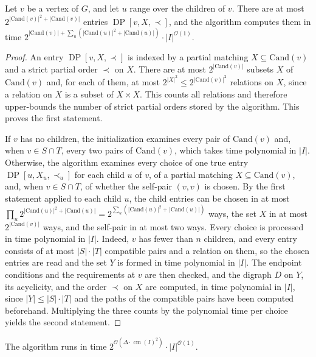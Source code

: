 \documentclass[a4paper,USenglish,thm-restate]{lipics-v2021}
\newcommand{\cm}{\operatorname{cm}}
\newcommand{\cand}{\mathrm{Cand}}
\theoremstyle{problemstyle}
\begin{document}
\begin{lemma}\label{lem:tree-dp-vertex-time}
Let $v$ be a vertex of $G$, and let $u$ range over the children of $v$. There are at most $2^{|\cand(v)|^2+|\cand(v)|}$ entries $\operatorname{DP}[v,X,\prec]$, and the algorithm computes them in time $2^{|\cand(v)|+\sum_u(|\cand(u)|^2+|\cand(u)|)}\cdot|I|^{\mathcal{O}(1)}$.
\end{lemma}

\begin{proof}
An entry $\operatorname{DP}[v,X,\prec]$ is indexed by a partial matching $X\subseteq\cand(v)$ and a strict partial order $\prec$ on $X$. There are at most $2^{|\cand(v)|}$ subsets $X$ of $\cand(v)$ and, for each of them, at most $2^{|X|^2}\le 2^{|\cand(v)|^2}$ relations on $X$, since a relation on $X$ is a subset of $X\times X$. This counts all relations and therefore upper-bounds the number of strict partial orders stored by the algorithm. This proves the first statement.

If $v$ has no children, the initialization examines every pair of $\cand(v)$ and, when $v\in S\cap T$, every two pairs of $\cand(v)$, which takes time polynomial in $|I|$. Otherwise, the algorithm examines every choice of one true entry $\operatorname{DP}[u,X_u,\prec_u]$ for each child $u$ of $v$, of a partial matching $X\subseteq\cand(v)$, and, when $v\in S\cap T$, of whether the self-pair $(v,v)$ is chosen. By the first statement applied to each child $u$, the child entries can be chosen in at most $\prod_u 2^{|\cand(u)|^2+|\cand(u)|}=2^{\sum_u(|\cand(u)|^2+|\cand(u)|)}$ ways, the set $X$ in at most $2^{|\cand(v)|}$ ways, and the self-pair in at most two ways. Every choice is processed in time polynomial in $|I|$. Indeed, $v$ has fewer than $n$ children, and every entry consists of at most $|S|\cdot|T|$ compatible pairs and a relation on them, so the chosen entries are read and the set $Y$ is formed in time polynomial in $|I|$. The endpoint conditions and the requirements at $v$ are then checked, and the digraph $D$ on $Y$, its acyclicity, and the order $\prec$ on $X$ are computed, in time polynomial in $|I|$, since $|Y|\le|S|\cdot|T|$ and the paths of the compatible pairs have been computed beforehand. Multiplying the three counts by the polynomial time per choice yields the second statement.
\end{proof}

\begin{lemma}\label{lem:tree-candidate-multiplicity-running-time}
The algorithm runs in time $2^{\mathcal{O}(\Delta\cdot\cm(I)^2)}\cdot|I|^{\mathcal{O}(1)}$.
\end{lemma}
\end{document}
